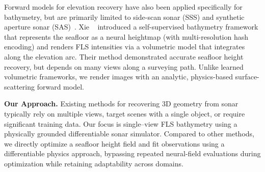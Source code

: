 Forward models for elevation recovery have also been applied specifically for bathymetry, but are primarily limited to side-scan sonar (SSS) and synthetic aperture sonar (SAS)~\cite{Xie2022SSSDiff2, Bore2023SSSDiff, Reed2023SASDiff, Xie2022SSSDiff1}. Xie \etal~\cite{Xie2024BathymetryFLSDiff} introduced a self-supervised bathymetry framework that represents the seafloor as a neural heightmap (with multi-resolution hash encoding) and renders FLS intensities via a volumetric model that integrates along the elevation arc. Their method demonstrated accurate seafloor height recovery, but depends on many views along a surveying path. Unlike learned volumetric frameworks, we render images with an analytic, physics-based surface-scattering forward model.

\vspace{4pt}
\noindent\textbf{Our Approach.}
Existing methods for recovering 3D geometry from sonar typically rely on multiple views, target scenes with a single object, or require significant training data. Our focus is single–view FLS bathymetry using a physically grounded differentiable sonar simulator. Compared to other methods, we directly optimize a seafloor height field and fit observations using a differentiable physics approach, bypassing repeated neural-field evaluations during optimization while retaining adaptability across domains.